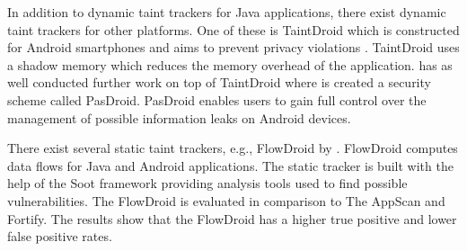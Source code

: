 In addition to dynamic taint trackers for Java applications, there exist dynamic taint trackers for other platforms. One of these is TaintDroid which is constructed for Android smartphones and aims to prevent privacy violations \parencite{EnckWilliam2014Taif}. TaintDroid uses a shadow memory which reduces the memory overhead of the application. \textcite{HsiaoS.W.2014PRse} has as well conducted further work on top of TaintDroid where is created a security scheme called PasDroid. PasDroid enables users to gain full control over the management of possible information leaks on Android devices.

There exist several static taint trackers, e.g., FlowDroid by \textcite{ArztS.2014FPcf}. FlowDroid computes data flows for Java and Android applications. The static tracker is built with the help of the Soot framework \parencite{soot} providing analysis tools used to find possible vulnerabilities. The FlowDroid is evaluated in comparison to The AppScan and Fortify. The results show that the FlowDroid has a higher true positive and lower false positive rates.